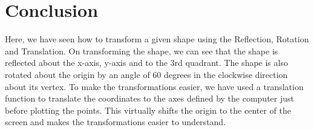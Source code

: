 \documentclass[12pt]{article}
\begin{document}
	\section{Conclusion}
	Here, we have seen how to transform a given shape using the Reflection, Rotation and Translation.
	On transforming the shape, we can see that the shape is reflected about the x-axis, y-axis and to the 3rd quadrant.
	The shape is also rotated about the origin by an angle of 60 degrees in the clockwise direction about its vertex.
	To make the transformations easier, we have used a translation function to translate the coordinates to the axes defined by the computer just 
	before plotting the points. This virtually shifts the origin to the center of the screen and makes the transformations easier to understand.
\end{document}
